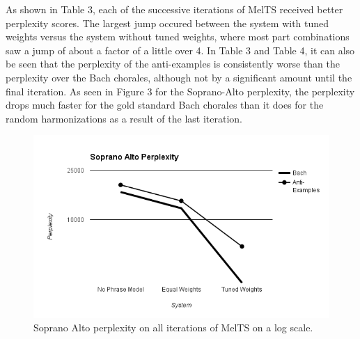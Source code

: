 \documentclass{sig-alternate}
\begin{document}
As shown in Table 3, each of the successive iterations of MelTS received better perplexity scores. The largest jump occured between the system with tuned weights versus the system without tuned weights, where most part combinations saw a jump of about a factor of a little over 4. In Table 3 and Table 4, it can also be seen that the perplexity of the anti-examples is consistently worse than the perplexity over the Bach chorales, although not by a significant amount until the final iteration. As seen in Figure 3 for the Soprano-Alto perplexity, the perplexity drops much faster for the gold standard Bach chorales than it does for the random harmonizations as a result of the last iteration.  

\begin{figure}
  \includegraphics[scale=0.5]{images/soprano_alto_perplexity}
  \caption{Soprano Alto perplexity on all iterations of MelTS on a log scale.}
\end{figure}
\end{document}
